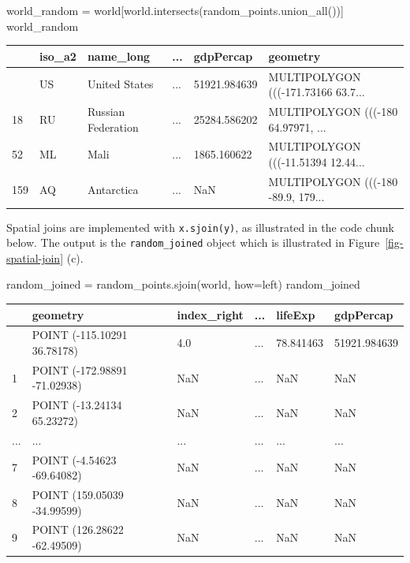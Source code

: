 \documentclass[
  letterpaper,
]{krantz}
\newenvironment{Shaded}{\begin{snugshade}}{\end{snugshade}}
\newcommand{\NormalTok}[1]{\textcolor[rgb]{0.00,0.23,0.31}{#1}}
\newcommand{\OperatorTok}[1]{\textcolor[rgb]{0.37,0.37,0.37}{#1}}
\newcommand{\StringTok}[1]{\textcolor[rgb]{0.13,0.47,0.30}{#1}}
\begin{document}
\begin{Shaded}
\begin{Highlighting}[]
\NormalTok{world\_random }\OperatorTok{=}\NormalTok{ world[world.intersects(random\_points.union\_all())]}
\NormalTok{world\_random}
\end{Highlighting}
\end{Shaded}

\begin{longtable}[]{@{}llllll@{}}
\toprule\noalign{}
& iso\_a2 & name\_long & ... & gdpPercap & geometry \\
\midrule\noalign{}
\endhead
\bottomrule\noalign{}
\endlastfoot
4 & US & United States & ... & 51921.984639 & MULTIPOLYGON (((-171.73166
63.7... \\
18 & RU & Russian Federation & ... & 25284.586202 & MULTIPOLYGON (((-180
64.97971, ... \\
52 & ML & Mali & ... & 1865.160622 & MULTIPOLYGON (((-11.51394
12.44... \\
159 & AQ & Antarctica & ... & NaN & MULTIPOLYGON (((-180 -89.9,
179... \\
\end{longtable}

Spatial joins are implemented with \texttt{x.sjoin(y)}, as illustrated
in the code chunk below. The output is the \texttt{random\_joined}
object which is illustrated in Figure~\ref{fig-spatial-join} (c).

\begin{Shaded}
\begin{Highlighting}[]
\NormalTok{random\_joined }\OperatorTok{=}\NormalTok{ random\_points.sjoin(world, how}\OperatorTok{=}\StringTok{\textquotesingle{}left\textquotesingle{}}\NormalTok{)}
\NormalTok{random\_joined}
\end{Highlighting}
\end{Shaded}

\begin{longtable}[]{@{}llllll@{}}
\toprule\noalign{}
& geometry & index\_right & ... & lifeExp & gdpPercap \\
\midrule\noalign{}
\endhead
\bottomrule\noalign{}
\endlastfoot
0 & POINT (-115.10291 36.78178) & 4.0 & ... & 78.841463 &
51921.984639 \\
1 & POINT (-172.98891 -71.02938) & NaN & ... & NaN & NaN \\
2 & POINT (-13.24134 65.23272) & NaN & ... & NaN & NaN \\
... & ... & ... & ... & ... & ... \\
7 & POINT (-4.54623 -69.64082) & NaN & ... & NaN & NaN \\
8 & POINT (159.05039 -34.99599) & NaN & ... & NaN & NaN \\
9 & POINT (126.28622 -62.49509) & NaN & ... & NaN & NaN \\
\end{longtable}
\end{document}
